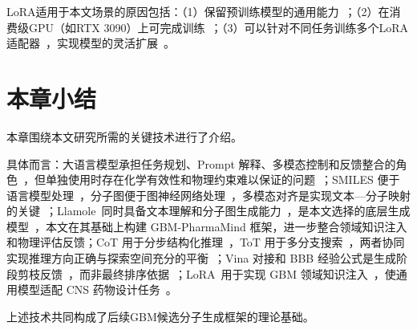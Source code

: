LoRA适用于本文场景的原因包括：（1）保留预训练模型的通用能力~\cite{hu2022lora}；（2）在消费级GPU（如RTX 3090）上可完成训练~\cite{hu2022lora}；（3）可以针对不同任务训练多个LoRA适配器~\cite{hu2022lora}，实现模型的灵活扩展~\cite{hu2022lora}。

\section{本章小结}\label{sec:ch2-summary}

本章围绕本文研究所需的关键技术进行了介绍。

具体而言：大语言模型承担任务规划、Prompt 解释、多模态控制和反馈整合的角色~\cite{Qwen2Team2024,jin2025effective}，但单独使用时存在化学有效性和物理约束难以保证的问题~\cite{jin2025effective,Li2025DrugPilot}；SMILES 便于语言模型处理~\cite{Weininger1988}，分子图便于图神经网络处理~\cite{Xu2019,Gilmer2017}，多模态对齐是实现文本—分子映射的关键~\cite{liu2025multimodal,Gao2023}；Llamole~\cite{liu2025multimodal}同时具备文本理解和分子图生成能力~\cite{liu2025multimodal}，是本文选择的底层生成模型~\cite{liu2025multimodal}，本文在其基础上构建 GBM-PharmaMind 框架，进一步整合领域知识注入和物理评估反馈；CoT 用于分步结构化推理~\cite{Wei2022}，ToT 用于多分支搜索~\cite{Yao2023}，两者协同实现推理方向正确与探索空间充分的平衡~\cite{Yao2023}；Vina 对接和 BBB 经验公式是生成阶段剪枝反馈~\cite{Trott2010,Clark2000}，而非最终排序依据~\cite{Trott2010,Clark2000,Daina2017}；LoRA~\cite{hu2022lora}用于实现 GBM 领域知识注入~\cite{hu2022lora}，使通用模型适配 CNS 药物设计任务~\cite{hu2022lora}。

上述技术共同构成了后续GBM候选分子生成框架的理论基础。
